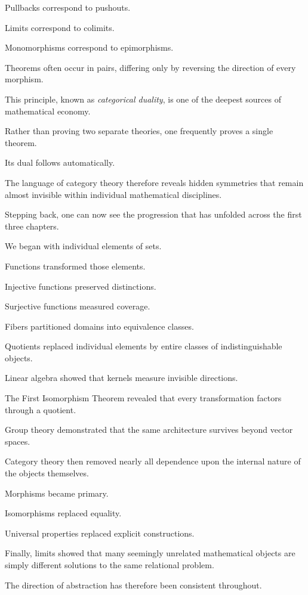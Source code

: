 \documentclass[11pt]{book}
\numberwithin{equation}{chapter}
\theoremstyle{definition}
\theoremstyle{plain}
\theoremstyle{remark}
\begin{document}
Pullbacks correspond to pushouts.

Limits correspond to colimits.

Monomorphisms correspond to epimorphisms.

Theorems often occur in pairs, differing only by reversing the direction of every morphism.

This principle, known as \emph{categorical duality}, is one of the deepest sources of mathematical economy.

Rather than proving two separate theories, one frequently proves a single theorem.

Its dual follows automatically.

The language of category theory therefore reveals hidden symmetries that remain almost invisible within individual mathematical disciplines.

Stepping back, one can now see the progression that has unfolded across the first three chapters.

We began with individual elements of sets.

Functions transformed those elements.

Injective functions preserved distinctions.

Surjective functions measured coverage.

Fibers partitioned domains into equivalence classes.

Quotients replaced individual elements by entire classes of indistinguishable objects.

Linear algebra showed that kernels measure invisible directions.

The First Isomorphism Theorem revealed that every transformation factors through a quotient.

Group theory demonstrated that the same architecture survives beyond vector spaces.

Category theory then removed nearly all dependence upon the internal nature of the objects themselves.

Morphisms became primary.

Isomorphisms replaced equality.

Universal properties replaced explicit constructions.

Finally, limits showed that many seemingly unrelated mathematical objects are simply different solutions to the same relational problem.

The direction of abstraction has therefore been consistent throughout.
\end{document}
